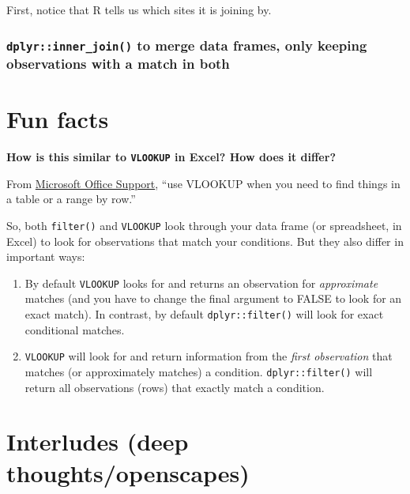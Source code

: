 \documentclass[]{book}
\begin{document}
First, notice that R tells us which sites it is joining by.

\hypertarget{dplyrinner_join-to-merge-data-frames-only-keeping-observations-with-a-match-in-both}{%
\subsubsection{\texorpdfstring{\texttt{dplyr::inner\_join()} to merge data frames, only keeping observations with a match in both}{dplyr::inner\_join() to merge data frames, only keeping observations with a match in both}}\label{dplyrinner_join-to-merge-data-frames-only-keeping-observations-with-a-match-in-both}}

\hypertarget{fun-facts}{%
\section{Fun facts}\label{fun-facts}}

\textbf{How is this similar to \texttt{VLOOKUP} in Excel? How does it differ?}

From \href{https://support.office.com/en-us/article/vlookup-function-0bbc8083-26fe-4963-8ab8-93a18ad188a1}{Microsoft Office Support}, ``use VLOOKUP when you need to find things in a table or a range by row.''

So, both \texttt{filter()} and \texttt{VLOOKUP} look through your data frame (or spreadsheet, in Excel) to look for observations that match your conditions. But they also differ in important ways:

\begin{enumerate}
\def\labelenumi{(\arabic{enumi})}
\item
  By default \texttt{VLOOKUP} looks for and returns an observation for \emph{approximate} matches (and you have to change the final argument to FALSE to look for an exact match). In contrast, by default \texttt{dplyr::filter()} will look for exact conditional matches.
\item
  \texttt{VLOOKUP} will look for and return information from the \emph{first observation} that matches (or approximately matches) a condition. \texttt{dplyr::filter()} will return all observations (rows) that exactly match a condition.
\end{enumerate}

\hypertarget{interludes-deep-thoughtsopenscapes-4}{%
\section{Interludes (deep thoughts/openscapes)}\label{interludes-deep-thoughtsopenscapes-4}}
\end{document}

